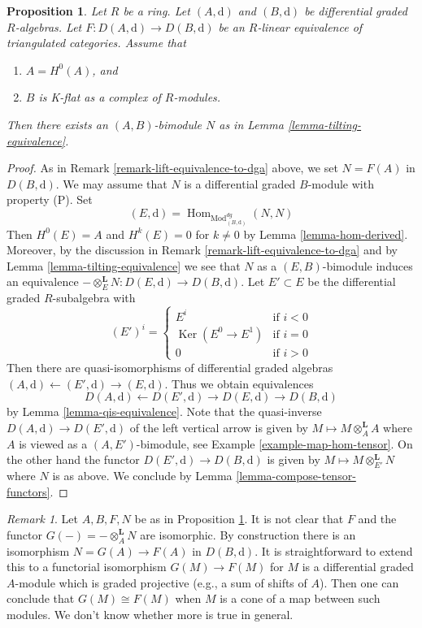 \documentclass{stacks-project}
\theoremstyle{plain}
\newtheorem{proposition}[subsection]{Proposition}
\theoremstyle{definition}
\theoremstyle{remark}
\newtheorem{remark}[subsection]{Remark}
\numberwithin{equation}{subsection}
\def\Hom{\mathop{\mathrm{Hom}}\nolimits}
\def\Ker{\mathop{\mathrm{Ker}}}
\begin{document}
\begin{proposition}
\label{proposition-rickard}
Let $R$ be a ring. Let $(A, \text{d})$ and $(B, \text{d})$ be
differential graded $R$-algebras. Let $F : D(A, \text{d}) \to D(B, \text{d})$
be an $R$-linear equivalence of triangulated categories. Assume that
\begin{enumerate}
\item $A = H^0(A)$, and
\item $B$ is K-flat as a complex of $R$-modules.
\end{enumerate}
Then there exists an $(A, B)$-bimodule $N$ as in
Lemma \ref{lemma-tilting-equivalence}.
\end{proposition}

\begin{proof}
As in Remark \ref{remark-lift-equivalence-to-dga} above, we set $N = F(A)$
in $D(B, \text{d})$. We may assume that $N$ is a differential graded
$B$-module with property (P). Set
$$
(E, \text{d}) = \Hom_{\text{Mod}^{dg}_{(B, \text{d})}}(N, N)
$$
Then $H^0(E) = A$ and $H^k(E) = 0$ for $k \not = 0$ by
Lemma \ref{lemma-hom-derived}.
Moreover, by the discussion in Remark \ref{remark-lift-equivalence-to-dga}
and by Lemma \ref{lemma-tilting-equivalence}
we see that $N$ as a $(E, B)$-bimodule induces an
equivalence $- \otimes_E^\mathbf{L} N : D(E, \text{d}) \to D(B, \text{d})$.
Let $E' \subset E$ be the differential graded $R$-subalgebra
with
$$
(E')^i = \left\{
\begin{matrix}
E^i & \text{if }i < 0 \\
\Ker(E^0 \to E^1) & \text{if }i = 0 \\
0 & \text{if }i > 0
\end{matrix}
\right.
$$
Then there are quasi-isomorphisms of differential graded
algebras $(A, \text{d}) \leftarrow (E', \text{d}) \rightarrow (E, \text{d})$.
Thus we obtain equivalences
$$
D(A, \text{d}) \leftarrow D(E', \text{d}) \rightarrow D(E, \text{d})
\rightarrow D(B, \text{d})
$$
by Lemma \ref{lemma-qis-equivalence}.
Note that the quasi-inverse $D(A, \text{d}) \to D(E', \text{d})$
of the left vertical arrow is given
by $M \mapsto M \otimes_A^\mathbf{L} A$ where $A$ is viewed as a
$(A, E')$-bimodule, see Example \ref{example-map-hom-tensor}.
On the other hand the functor $D(E', \text{d}) \to D(B, \text{d})$ is given by
$M \mapsto M \otimes_{E'}^\mathbf{L} N$ where $N$ is as above.
We conclude by Lemma \ref{lemma-compose-tensor-functors}.
\end{proof}

\begin{remark}
\label{remark-rickard}
Let $A, B, F, N$ be as in Proposition \ref{proposition-rickard}.
It is not clear that $F$ and the functor
$G(-) = - \otimes_A^\mathbf{L} N$ are isomorphic.
By construction there is an isomorphism
$N = G(A) \to F(A)$ in $D(B, \text{d})$.
It is straightforward to extend this to a functorial isomorphism
$G(M) \to F(M)$ for $M$ is a differential graded $A$-module which
is graded projective (e.g., a sum of shifts of $A$).
Then one can conclude that $G(M) \cong F(M)$ when $M$ is a cone
of a map between such modules. We don't know whether more is true
in general.
\end{remark}
\end{document}
